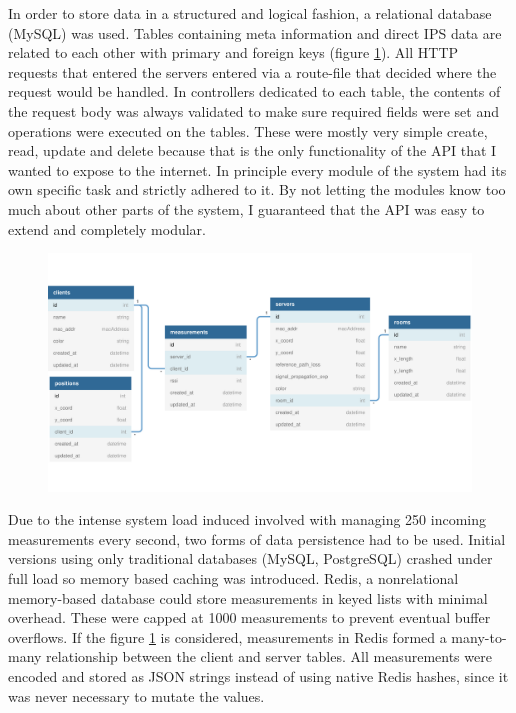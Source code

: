 \documentclass[a4paper, oneside]{ipsreport}
\begin{document}
In order to store data in a structured and logical fashion, a relational database (MySQL) was used. Tables containing meta information and direct IPS data are related to each other with primary and foreign keys (figure \ref{fig:dataschema}). All HTTP requests that entered the servers entered via a route-file that decided where the request would be handled. In controllers dedicated to each table, the contents of the request body was always validated to make sure required fields were set and operations were executed on the tables. These were mostly very simple create, read, update and delete because that is the only functionality of the API that I wanted to expose to the internet. In principle every module of the system had its own specific task and strictly adhered to it. By not letting the modules know too much about other parts of the system, I guaranteed that the API was easy to extend and completely modular.


\begin{figure}[h]
	\centering
	\includegraphics[width=\linewidth]{./figures/ble-ips-api.pdf}
	\label{fig:dataschema}
\end{figure}

Due to the intense system load induced involved with managing 250 incoming measurements every second, two forms of data persistence had to be used. Initial versions using only traditional databases (MySQL, PostgreSQL) crashed under full load so memory based caching was introduced. Redis, a nonrelational memory-based database could store measurements in keyed lists with minimal overhead. These were capped at 1000 measurements to prevent eventual buffer overflows. If the figure \ref{fig:dataschema} is considered, measurements in Redis formed a many-to-many relationship between the client and server tables. All measurements were encoded and stored as JSON strings instead of using native Redis hashes, since it was never necessary to mutate the values.
\end{document}
